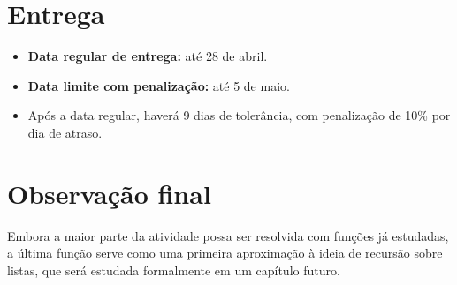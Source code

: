\documentclass{article}
\begin{document}
\section{Entrega}

\begin{itemize}
  \item \textbf{Data regular de entrega:} até 28 de abril.
  \item \textbf{Data limite com penalização:} até 5 de maio.
  \item Após a data regular, haverá 9 dias de tolerância, com penalização de
  10\% por dia de atraso.
\end{itemize}

\section{Observação final}

Embora a maior parte da atividade possa ser resolvida com funções já
estudadas, a última função serve como uma primeira aproximação à ideia de
recursão sobre listas, que será estudada formalmente em um capítulo futuro.
\end{document}
